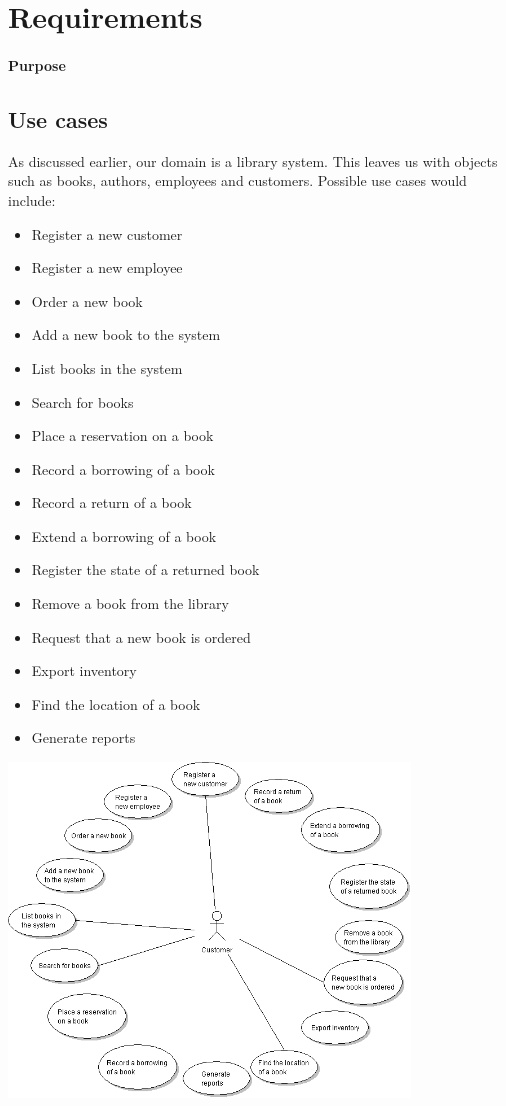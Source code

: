 \chapter{Requirements}

\minitoc

\subsubsection{Purpose}

\clearpage

\section{Use cases}
As discussed earlier, our domain is a library system. This leaves us with objects such as books, authors, employees and customers. Possible use cases would include: 
\begin{itemize}
  \item Register a new customer
  \item Register a new employee
  \item Order a new book
  \item Add a new book to the system
  \item List books in the system
  \item Search for books
  \item Place a reservation on a book
  \item Record a borrowing of a book
  \item Record a return of a book
  \item Extend a borrowing of a book
  \item Register the state of a returned book
  \item Remove a book from the library
  \item Request that a new book is ordered
  \item Export inventory
  \item Find the location of a book
  \item Generate reports
\end{itemize}

\begin{center}
\includegraphics[width = 0.8\textwidth]{image/usecase-customer.png}
\label{usecase-customer}%
\end{center}

